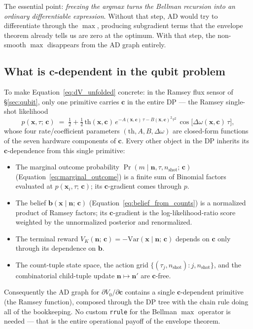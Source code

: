 \documentclass[11pt]{article}
\newcommand{\bc}{\bm{c}}
\newcommand{\bx}{\bm{x}}
\newcommand{\bb}{\bm{b}}
\begin{document}
The essential point: \emph{freezing the argmax turns the Bellman recursion into an ordinary differentiable expression}.  Without that step, AD would try to differentiate through the $\max$, producing subgradient terms that the envelope theorem already tells us are zero at the optimum.  With that step, the non-smooth $\max$ disappears from the AD graph entirely.

\subsection{What is \texorpdfstring{$\bc$}{c}-dependent in the qubit problem}

To make Equation~\eqref{eq:dV_unfolded} concrete: in the Ramsey flux sensor of §\ref{sec:qubit}, only one primitive carries $\bc$ in the entire DP --- the Ramsey single-shot likelihood
\begin{equation*}
p(\bx, \tau;\, \bc) \;=\; \tfrac{1}{2} + \tfrac{1}{2}\,\mathrm{th}(\bx, \bc)\, e^{-A(\bx, \bc)\,\tau - B(\bx, \bc)^2 \tau^2}\, \cos\bigl[\Delta\omega(\bx, \bc)\, \tau\bigr],
\end{equation*}
whose four rate/coefficient parameters $(\mathrm{th}, A, B, \Delta\omega)$ are closed-form functions of the seven hardware components of $\bc$.  Every other object in the DP inherits its $\bc$-dependence from this single primitive:

\begin{itemize}[nosep, leftmargin=*]
\item The marginal outcome probability $\Pr(m \mid \mathbf{n}, \tau, n_\text{shot};\, \bc)$ (Equation~\eqref{eq:marginal_outcome}) is a finite sum of Binomial factors evaluated at $p(\bx_i, \tau;\, \bc)$; its $\bc$-gradient comes through $p$.
\item The belief $\bb(\bx \mid \mathbf{n};\, \bc)$ (Equation~\eqref{eq:belief_from_counts}) is a normalized product of Ramsey factors; its $\bc$-gradient is the log-likelihood-ratio score weighted by the unnormalized posterior and renormalized.
\item The terminal reward $V_K(\mathbf{n};\, \bc) = -\mathrm{Var}(\bx \mid \mathbf{n};\, \bc)$ depends on $\bc$ only through its dependence on $\bb$.
\item The count-tuple state space, the action grid $\{(\tau_j, n_\text{shot}) : j, n_\text{shot}\}$, and the combinatorial child-tuple update $\mathbf{n} \mapsto \mathbf{n}'$ are $\bc$-free.
\end{itemize}

Consequently the AD graph for $\partial V_0 / \partial \bc$ contains a single $\bc$-dependent primitive (the Ramsey function), composed through the DP tree with the chain rule doing all of the bookkeeping.  No custom \texttt{rrule} for the Bellman $\max$ operator is needed --- that is the entire operational payoff of the envelope theorem.
\end{document}

